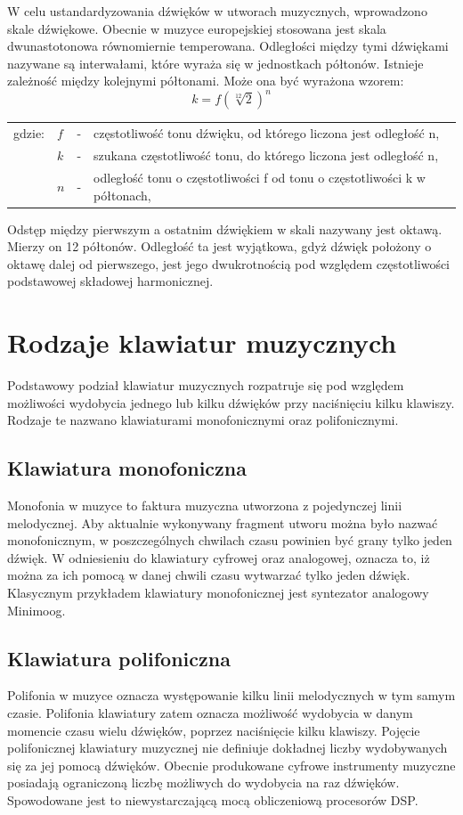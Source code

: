 W celu ustandardyzowania dźwięków w utworach muzycznych, wprowadzono skale dźwiękowe. Obecnie w muzyce europejskiej stosowana jest skala dwunastotonowa równomiernie temperowana. Odległości między tymi dźwiękami nazywane są interwałami, które wyraża się w jednostkach półtonów. Istnieje zależność między kolejnymi półtonami. Może ona być wyrażona wzorem:
\begin{equation} \label{equ:wpr_dzwiek}
k = f(\sqrt[12]{2})^{n}
\end{equation}
\begin{tabular}{ l l l l}
	gdzie: 	&	$f$ & - &  częstotliwość tonu dźwięku, od którego liczona jest odległość n, \\
	&	$k$ & - &  szukana częstotliwość tonu, do którego liczona jest odległość n, \\
	&   $n$ &  - & odległość tonu o częstotliwości f od tonu o częstotliwości k w półtonach, \\
\end{tabular}

Odstęp między pierwszym a ostatnim dźwiękiem w skali nazywany jest oktawą. Mierzy on 12 półtonów. Odległość ta jest wyjątkowa, gdyż dźwięk położony o oktawę dalej od pierwszego, jest jego dwukrotnością pod względem częstotliwości podstawowej składowej harmonicznej.



\section{Rodzaje klawiatur muzycznych}
Podstawowy podział klawiatur muzycznych rozpatruje się pod względem możliwości wydobycia jednego lub kilku dźwięków przy naciśnięciu kilku klawiszy. Rodzaje te nazwano klawiaturami monofonicznymi oraz polifonicznymi.

\subsection{Klawiatura monofoniczna}
Monofonia w muzyce to faktura muzyczna utworzona z pojedynczej linii melodycznej. Aby aktualnie wykonywany fragment utworu można było nazwać monofonicznym, w poszczególnych chwilach czasu powinien być grany tylko jeden dźwięk. W odniesieniu do klawiatury cyfrowej oraz analogowej, oznacza to, iż można za ich pomocą w danej chwili czasu wytwarzać tylko jeden dźwięk. Klasycznym przykładem klawiatury monofonicznej jest syntezator analogowy Minimoog.

\subsection{Klawiatura polifoniczna}
Polifonia w muzyce oznacza występowanie kilku linii melodycznych w tym samym czasie. Polifonia klawiatury zatem oznacza możliwość wydobycia w danym momencie czasu wielu dźwięków, poprzez naciśnięcie kilku klawiszy. Pojęcie polifonicznej klawiatury muzycznej nie definiuje dokładnej liczby wydobywanych się za jej pomocą dźwięków. Obecnie produkowane cyfrowe instrumenty muzyczne posiadają ograniczoną liczbę możliwych do wydobycia na raz dźwięków. Spowodowane jest to niewystarczającą mocą obliczeniową procesorów DSP.

